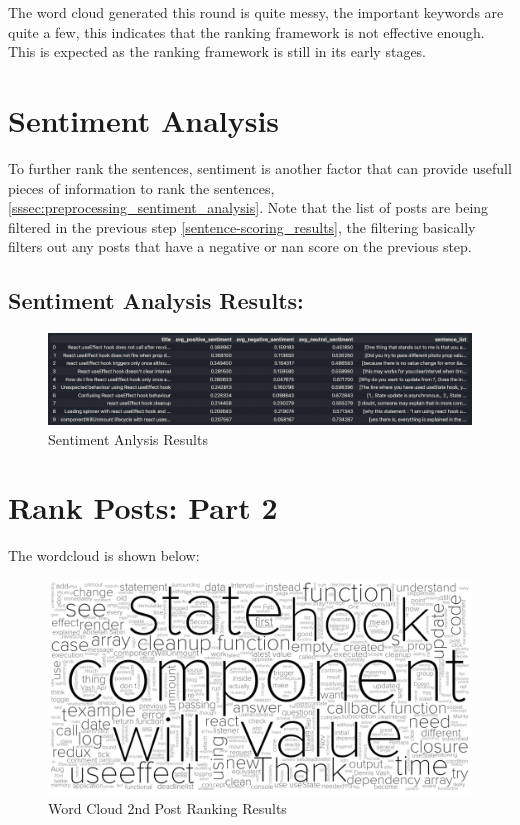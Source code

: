 \noindent The word cloud generated this round is quite messy, the important keywords are quite a few, this indicates that the ranking framework is not effective enough. This is expected as the ranking framework is still in its early stages.

\section{Sentiment Analysis} \label{sentiment-analysis_results}
To further rank the sentences, sentiment is another factor that can provide usefull pieces of information to rank the sentences, \ref{sssec:preprocessing_sentiment_analysis}. Note that the list of posts are being filtered in the previous step \ref{sentence-scoring_results}, the filtering basically filters out any posts that have a negative or nan score on the previous step.

\subsection{Sentiment Analysis Results:} \label{sentiment_analysis_results}
\begin{figure}[H]
  \centering
  \includegraphics[scale=0.60, angle=90]{assets/sentiment_analysis.png}
  \caption{Sentiment Anlysis Results}
  \label{fig:sentiment-analysis}
\end{figure}

\section{Rank Posts: Part 2} \label{rank-posts_2_results}
The wordcloud is shown below:

\begin{figure}[H]
  \centering
  \includegraphics[scale=0.35]{assets/rank_post_2.png}
  \caption{Word Cloud 2nd Post Ranking  Results}
  \label{fig:rank_post_2_wc}
\end{figure}

